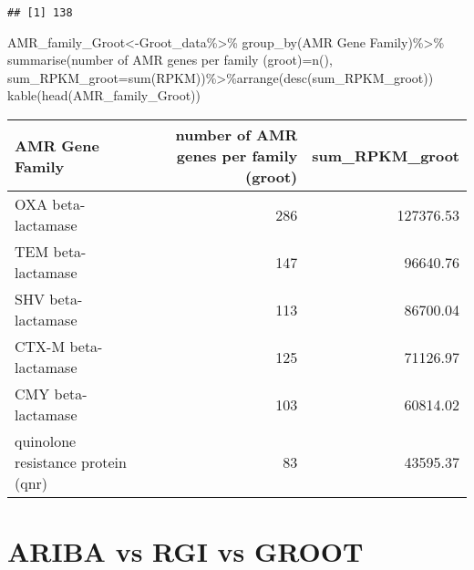 \documentclass[
]{article}
\newenvironment{Shaded}{\begin{snugshade}}{\end{snugshade}}
\newcommand{\AttributeTok}[1]{\textcolor[rgb]{0.77,0.63,0.00}{#1}}
\newcommand{\FunctionTok}[1]{\textcolor[rgb]{0.00,0.00,0.00}{#1}}
\newcommand{\NormalTok}[1]{#1}
\newcommand{\OtherTok}[1]{\textcolor[rgb]{0.56,0.35,0.01}{#1}}
\newcommand{\SpecialCharTok}[1]{\textcolor[rgb]{0.00,0.00,0.00}{#1}}
\newcommand{\StringTok}[1]{\textcolor[rgb]{0.31,0.60,0.02}{#1}}
\begin{document}
\begin{Shaded}
\end{Shaded}

\begin{verbatim}
## [1] 138
\end{verbatim}

\begin{Shaded}
\begin{Highlighting}[]
\NormalTok{AMR\_family\_Groot}\OtherTok{\textless{}{-}}\NormalTok{Groot\_data}\SpecialCharTok{\%\textgreater{}\%}
  \FunctionTok{group\_by}\NormalTok{(}\StringTok{\textasciigrave{}}\AttributeTok{AMR Gene Family}\StringTok{\textasciigrave{}}\NormalTok{)}\SpecialCharTok{\%\textgreater{}\%}
  \FunctionTok{summarise}\NormalTok{(}\StringTok{\textquotesingle{}number of AMR genes per family (groot)\textquotesingle{}}\OtherTok{=}\FunctionTok{n}\NormalTok{(),}
            \AttributeTok{sum\_RPKM\_groot=}\FunctionTok{sum}\NormalTok{(RPKM))}\SpecialCharTok{\%\textgreater{}\%}\FunctionTok{arrange}\NormalTok{(}\FunctionTok{desc}\NormalTok{(sum\_RPKM\_groot))}
\FunctionTok{kable}\NormalTok{(}\FunctionTok{head}\NormalTok{(AMR\_family\_Groot))}
\end{Highlighting}
\end{Shaded}

\begin{longtable}[]{@{}lrr@{}}
\toprule
AMR Gene Family & number of AMR genes per family (groot) &
sum\_RPKM\_groot \\
\midrule
\endhead
OXA beta-lactamase & 286 & 127376.53 \\
TEM beta-lactamase & 147 & 96640.76 \\
SHV beta-lactamase & 113 & 86700.04 \\
CTX-M beta-lactamase & 125 & 71126.97 \\
CMY beta-lactamase & 103 & 60814.02 \\
quinolone resistance protein (qnr) & 83 & 43595.37 \\
\bottomrule
\end{longtable}

\hypertarget{ariba-vs-rgi-vs-groot}{%
\section{ARIBA vs RGI vs GROOT}\label{ariba-vs-rgi-vs-groot}}
\end{document}
